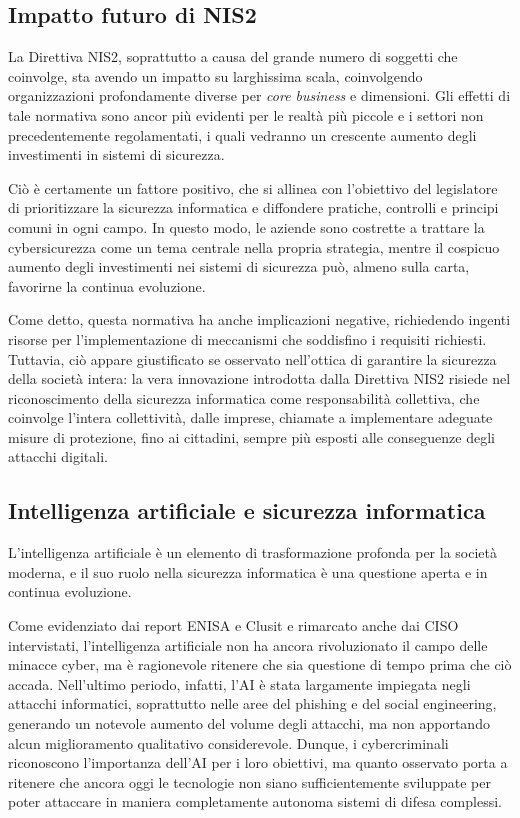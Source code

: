 \subsection{Impatto futuro di NIS2}
La Direttiva NIS2, soprattutto a causa del grande numero di soggetti che coinvolge, sta avendo un impatto su larghissima scala, coinvolgendo 
organizzazioni profondamente diverse per \textit{core business} e dimensioni. Gli effetti di tale normativa sono ancor più evidenti per le 
realtà più piccole e i settori non precedentemente regolamentati, i quali vedranno un crescente aumento degli investimenti in sistemi di 
sicurezza.

Ciò è certamente un fattore positivo, che si allinea con l'obiettivo del legislatore di prioritizzare la sicurezza informatica e diffondere
pratiche, controlli e principi comuni in ogni campo. In questo modo, le aziende sono costrette a trattare la cybersicurezza come un tema 
centrale nella propria strategia, mentre il cospicuo aumento degli investimenti nei sistemi di sicurezza può, almeno sulla carta,
favorirne la continua evoluzione.

Come detto, questa normativa ha anche implicazioni negative, richiedendo ingenti risorse per l'implementazione di meccanismi che soddisfino i 
requisiti richiesti. Tuttavia, ciò appare giustificato se osservato nell'ottica di garantire la sicurezza della società intera: la vera innovazione 
introdotta dalla Direttiva NIS2 risiede nel riconoscimento della sicurezza informatica come responsabilità collettiva, che coinvolge l’intera collettività, 
dalle imprese, chiamate a implementare adeguate misure di protezione, fino ai cittadini, sempre più esposti alle conseguenze degli attacchi digitali.


\subsection{Intelligenza artificiale e sicurezza informatica}
L’intelligenza artificiale è un elemento di trasformazione profonda per la società moderna, e il suo ruolo nella sicurezza informatica è 
una questione aperta e in continua evoluzione.

Come evidenziato dai report ENISA e Clusit e rimarcato anche dai CISO intervistati, l'intelligenza artificiale non ha ancora rivoluzionato 
il campo delle minacce cyber, ma è ragionevole ritenere che sia questione di tempo prima che ciò accada. Nell'ultimo periodo, infatti, l'AI 
è stata largamente impiegata negli attacchi informatici, soprattutto nelle aree del phishing e del social engineering, generando un notevole 
aumento del volume degli attacchi, ma non apportando alcun miglioramento qualitativo considerevole. Dunque, i cybercriminali riconoscono l'importanza 
dell'AI per i loro obiettivi, ma quanto osservato porta a ritenere che ancora oggi le tecnologie non siano sufficientemente sviluppate per 
poter attaccare in maniera completamente autonoma sistemi di difesa complessi.

